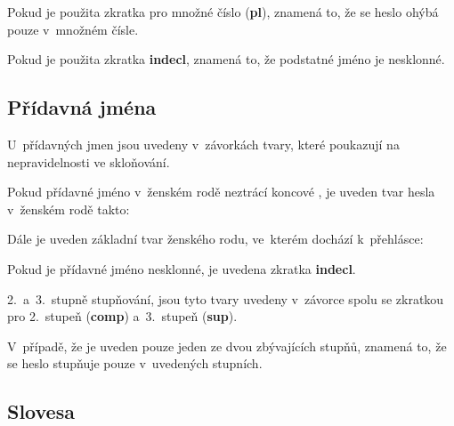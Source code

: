 \blspace
  \dicEntry {}  
\blspace

Pokud je použita zkratka pro množné číslo (\textbf{pl}), znamená to, že se heslo ohýbá pouze v~množném čísle.

\blspace
  \dicEntry {}  
\blspace

Pokud je použita zkratka \textbf{indecl}, znamená to, že podstatné jméno je nesklonné.

\blspace
  \dicEntry {}  
\blspace

\subsection*{Přídavná jména}

U~přídavných jmen jsou uvedeny v~závorkách tvary, které poukazují na nepravidelnosti ve skloňování.

Pokud přídavné jméno v~ženském rodě neztrácí koncové , je uveden tvar hesla v~ženském rodě takto:

\blspace
  \dicEntry {}  
\blspace

Dále je uveden základní tvar ženského rodu, ve~kterém dochází k~přehlásce:

\blspace
  \dicEntry {}  
\blspace

Pokud je přídavné jméno nesklonné, je uvedena zkratka \textbf{indecl}.

\blspace
  \dicEntry {}  
\blspace

 2.~a~3.~stupně stupňování, jsou tyto tvary uvedeny v~závorce spolu se zkratkou pro 2.~stupeň (\textbf{comp}) a~3.~stupeň (\textbf{sup}).

\blspace
  \dicEntry {}  
\blspace

V~případě, že je uveden pouze jeden ze dvou zbývajících stupňů, znamená to, že se heslo stupňuje pouze v~uvedených stupních.

\blspace
  \dicEntry {}  
\blspace

\subsection*{Slovesa}

